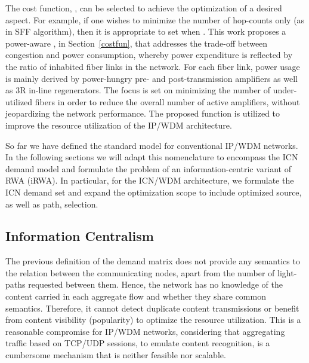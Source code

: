 \documentclass[journal]{IEEEtran}
\begin{document}
The cost function, , can be selected to achieve the optimization of a desired aspect. For example, if one wishes to minimize the number of hop-counts only
(as in SFF algorithm), then it is appropriate to set  when
. 
This work proposes a power-aware , in Section~\ref{costfun},
that addresses the trade-off between congestion and power consumption,
whereby power expenditure is reflected by the ratio of inhabited fiber
links in the network. For each fiber link, power usage is mainly
derived by power-hungry pre- and post-transmission amplifiers as well
as 3R in-line regenerators. The focus is set on minimizing the number
of under-utilized fibers in order to reduce the overall number of
active amplifiers, without jeopardizing the network performance. The
proposed function is utilized to improve the resource utilization of
the IP/WDM architecture.

So far we have defined the standard model for conventional IP/WDM
networks. In the following sections we will adapt this nomenclature to
encompass the ICN demand model and formulate the problem of
an information-centric variant of RWA (iRWA). In particular, for the
ICN/WDM architecture, we formulate the ICN demand set and expand the
optimization scope to include optimized source, as well as path,
selection.

\subsection{Information Centralism}\label{sec:icndefs}
The previous definition of the demand matrix does not provide any semantics to the relation between the communicating nodes, apart from the number of light-paths requested between them. Hence, the network has no knowledge of the content carried in each aggregate flow and whether they share common semantics. Therefore, it cannot detect duplicate content transmissions or benefit from content visibility (popularity) to optimize the resource utilization.
This is a reasonable compromise for IP/WDM networks, considering that aggregating traffic based on TCP/UDP sessions, to emulate content recognition, is a cumbersome mechanism that is neither feasible nor scalable.
\end{document}
